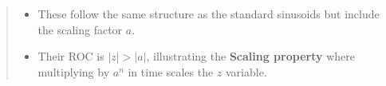 \begin{quote}
\begin{itemize}
  \begin{itemize}
  \tightlist
  \item
    These follow the same structure as the standard sinusoids but
    include the scaling factor \textbf{\(a\)}.
  \item
    Their ROC is \textbf{\(|z| > |a|\)}, illustrating the
    \textbf{Scaling property} where multiplying by \(a^n\) in time
    scales the \(z\) variable.
  \end{itemize}
\end{itemize}
\end{quote}

